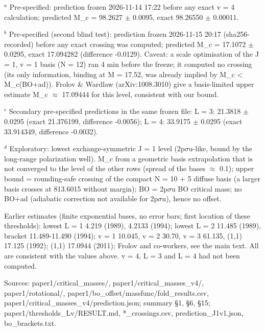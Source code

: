 \begin{table}[t]
\par\footnotesize $^a$ Pre-specified: prediction frozen 2026-11-14 17:22 before any exact v = 4 calculation; predicted M\_c = 98.2627 $\pm$ 0.0095, exact 98.26550 $\pm$ 0.00011.
\par\footnotesize $^b$ Pre-specified (second blind test): prediction frozen 2026-11-15 20:17 (sha256-recorded) before any exact crossing was computed; predicted M\_c = 17.1072 $\pm$ 0.0295, exact 17.094282 (difference -0.0129). Caveat: a scale optimisation of the J = 1, v = 1 basis (N = 12) ran 4 min before the freeze; it computed no crossing (its only information, binding at M = 17.52, was already implied by M\_c < M\_c(BO+ad)). Frolov \& Wardlaw (arXiv:1008.3010) give a basis-limited upper estimate M\_c $\approx$ 17.09444 for this level, consistent with our bound.
\par\footnotesize $^c$ Secondary pre-specified predictions in the same frozen file: L = 3: 21.3818 $\pm$ 0.0295 (exact 21.376199, difference -0.0056); L = 4: 33.9175 $\pm$ 0.0295 (exact 33.914349, difference -0.0032).
\par\footnotesize $^d$ Exploratory: lowest exchange-symmetric J = 1 level (2p$\sigma$u-like, bound by the long-range polarization well). M\_c from a geometric basis extrapolation that is not converged to the level of the other rows (spread of the bases $\approx$ 0.1); upper bound = rounding-safe crossing of the compact N = 10 + 5 diffuse basis (a larger basis crosses at 813.6015 without margin); BO = 2p$\sigma$u BO critical mass; no BO+ad (adiabatic correction not available for 2p$\sigma$u), hence no offset.
\par\footnotesize Earlier estimates (finite exponential bases, no error bars; first location of these thresholds): lowest L = 1 4.219 (1989), 4.2133 (1994); lowest L = 2 11.485 (1989), bracket 11.489-11.490 (1994); v = 1 10.045, v = 2 30.70, v = 3 61.135, (1,1) 17.125 (1992); (1,1) 17.0944 (2011); Frolov and co-workers, see the main text. All are consistent with the values above. v = 4, L = 3 and L = 4 had not been computed.
\par\footnotesize Sources: paper1/critical\_masses/, paper1/critical\_masses\_v4/, paper1/rotational/, paper1/bo\_offset/massfunc/fold\_results.csv, paper1/critical\_masses\_v4/prediction.json; summary \S1, \S6, \S15; paper1/thresholds\_Lv/RESULT.md, *\_crossings.csv, prediction\_J1v1.json, bo\_brackets.txt.
\end{table}

